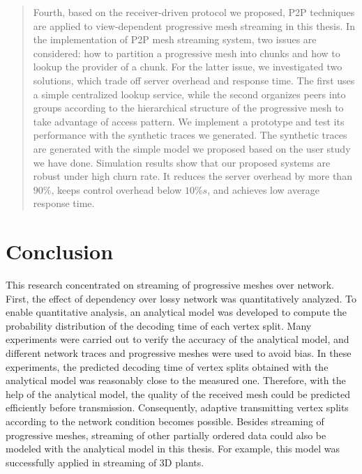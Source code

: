 \documentclass[11pt, a4paper]{report}
\begin{document}
\begin{abstract}
    Fourth, based on the receiver-driven protocol we proposed, 
    P2P techniques are applied to view-dependent progressive mesh streaming in this thesis. 
    In the implementation of P2P mesh streaming system,
    two issues are considered: how to partition a progressive mesh into chunks and 
    how to lookup the provider of a chunk. For the latter issue, we investigated 
    two solutions, which trade off server overhead and response time. The first
    uses a simple centralized lookup service, while the second organizes peers into
    groups according to the hierarchical structure of the progressive mesh to 
    take advantage of access pattern. We implement a prototype and test its performance
    with the synthetic traces we generated. The synthetic traces are generated with the simple model we proposed based on the user study we have done. 
    Simulation results show that our proposed systems are robust under high churn rate. It reduces the server overhead
    by more than $90\%$, keeps control overhead below $10\%s$, and achieves
    low average response time.
\end{abstract}
   
%

%
%
%

\chapter{Conclusion}
\label{c:conclusion}
This research concentrated on streaming of progressive meshes over network. 
First, the effect of dependency over lossy network was quantitatively analyzed. 
To enable quantitative analysis, an analytical model was developed to compute 
the probability distribution of the decoding time of each vertex split. 
Many experiments were carried out to verify the accuracy of the analytical model, 
and different network traces and progressive meshes were used to avoid bias. 
In these experiments, the predicted decoding time of vertex splits obtained 
with the analytical model was reasonably close to the measured one. 
Therefore, with the help of the analytical model, 
the quality of the received mesh could be predicted efficiently before transmission.
Consequently, adaptive transmitting vertex splits according to the network condition
becomes possible. Besides streaming of progressive meshes, 
streaming of other partially ordered data could also be modeled
with the analytical model in this thesis. 
For example, this model was successfully applied in streaming of 3D plants.
\end{document}
